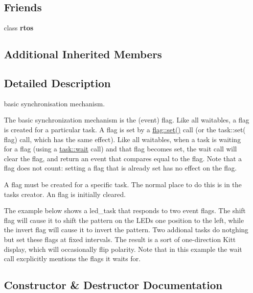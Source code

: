 \subsection*{Friends}
\begin{DoxyCompactItemize}
\item 
class {\bfseries rtos}\hypertarget{classrtos_1_1flag_a2a7bcfc34141352757ad672e3ecd099f}{}\label{classrtos_1_1flag_a2a7bcfc34141352757ad672e3ecd099f}

\end{DoxyCompactItemize}
\subsection*{Additional Inherited Members}


\subsection{Detailed Description}
basic synchronisation mechanism. 

The basic synchronization mechanism is the (event) flag. Like all waitables, a flag is created for a particular task. A flag is set by a \hyperlink{classrtos_1_1flag_a7372dff631de89809f25edef544ff884}{flag\+::set()} call (or the task\+::set( flag) call, which has the same effect). Like all waitables, when a task is waiting for a flag (using a \hyperlink{classrtos_1_1task__base_a2590ba76480cecaff66282516fbeb1bb}{task\+::wait} call) and that flag becomes set, the wait call will clear the flag, and return an event that compares equal to the flag. Note that a flag does not count\+: setting a flag that is already set has no effect on the flag.

A flag must be created for a specific task. The normal place to do this is in the task\textquotesingle{}s creator. An flag is initially cleared.

The example below shows a led\+\_\+task that responds to two event flags. The shift flag will cause it to shift the pattern on the L\+E\+Ds one position to the left, while the invert flag will cause it to invert the pattern. Two addional tasks do notghing but set these flags at fixed intervals. The result is a sort of one-\/direction Kitt display, which will occasionally flip polarity. Note that in this example the wait call excplicitly mentions the flags it waits for. 

\subsection{Constructor \& Destructor Documentation}
